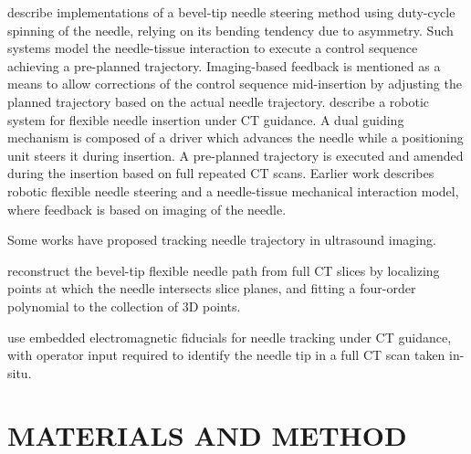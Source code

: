\documentclass[letterpaper, 10 pt, conference]{ieeeconf}  %
\begin{document}
\cite{wu2013automatic} \cite{engh2010percutaneous} describe implementations of a bevel-tip needle steering method using duty-cycle spinning of the needle, relying on its bending tendency due to asymmetry. Such systems model the needle-tissue interaction to execute a control sequence achieving a pre-planned trajectory. Imaging-based feedback is mentioned as a means to allow corrections of the control sequence mid-insertion by adjusting the planned trajectory based on the actual needle trajectory.
\cite{ben2018robotic} describe a robotic system for flexible needle insertion under CT guidance. A dual guiding mechanism is composed of a driver which advances the needle while a positioning unit steers it during insertion. A pre-planned trajectory is executed and amended during the insertion based on full repeated CT scans.
Earlier work \cite{glozman2007image} describes robotic flexible needle steering and a needle-tissue mechanical interaction model, where feedback is based on imaging of the needle.

Some works have proposed tracking needle trajectory in ultrasound imaging.

\cite{huo2015shape} reconstruct the bevel-tip flexible needle path from full CT slices by localizing points at which the needle intersects slice planes, and fitting a four-order polynomial to the collection of 3D points.

\cite{yaniv2010needle} use embedded electromagnetic fiducials for needle tracking under CT guidance, with operator input required to identify the needle tip in a full CT scan taken in-situ.

\section{MATERIALS AND METHOD}
\end{document}
